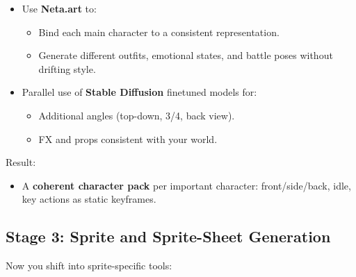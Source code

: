 \documentclass[11pt]{article}
\begin{document}
\begin{itemize}
    \item Use \textbf{Neta.art} to:
    \begin{itemize}
        \item Bind each main character to a consistent representation.
        \item Generate different outfits, emotional states, and battle poses without drifting style.
    \end{itemize}
    \item Parallel use of \textbf{Stable Diffusion} finetuned models for:
    \begin{itemize}
        \item Additional angles (top-down, 3/4, back view).
        \item FX and props consistent with your world.
    \end{itemize}
\end{itemize}

Result:
\begin{itemize}
    \item A \textbf{coherent character pack} per important character: front/side/back, idle, key actions as static keyframes.
\end{itemize}

\subsection{Stage 3: Sprite and Sprite-Sheet Generation}

Now you shift into sprite-specific tools:
\end{document}
